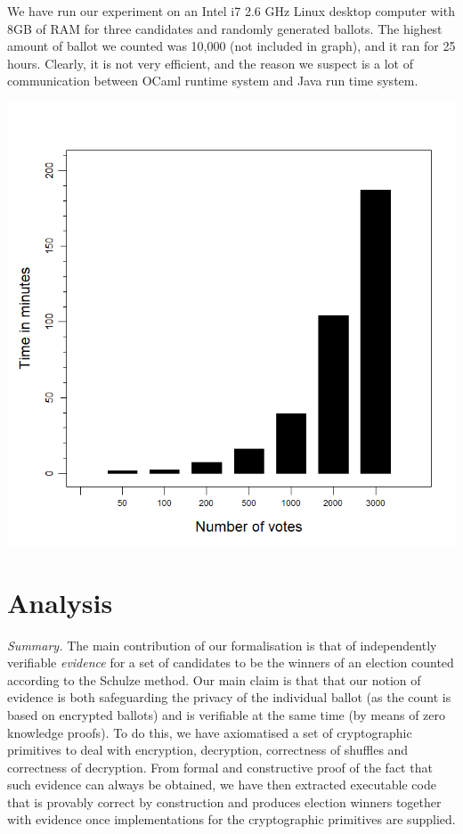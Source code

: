 \documentclass{llncs}
\begin{document}
We have run our experiment on an  Intel  i7  2.6  GHz  Linux  desktop  computer
with  8GB  of  RAM for three candidates and randomly generated ballots. The 
highest amount of ballot we counted was 10,000 (not included in graph), and 
it ran for 25 hours. Clearly, it is not very efficient, and the reason we 
suspect is a lot of communication between OCaml runtime system 
and Java run time system.
\begin{center}
\includegraphics[scale=0.40]{PlotVer3.png}

\end{center}



\section{Analysis}

\noindent\emph{Summary.} The main contribution of our formalisation is that of independently
verifiable \emph{evidence} for a set of candidates to be the winners
of an election counted according to the Schulze method. Our main
claim is that that our notion of evidence is both safeguarding the
privacy of the individual ballot (as the count is based on encrypted
ballots) and is verifiable at the same time (by means of zero
knowledge proofs). To do this, we have axiomatised a set of
cryptographic primitives to deal with encryption, decryption,
correctness of shuffles and correctness of decryption. From formal
and constructive proof of the fact that such evidence can always be
obtained, we have then extracted executable code that is provably
correct by construction and produces election winners together with
evidence once implementations for the cryptographic primitives are
supplied.
\end{document}
